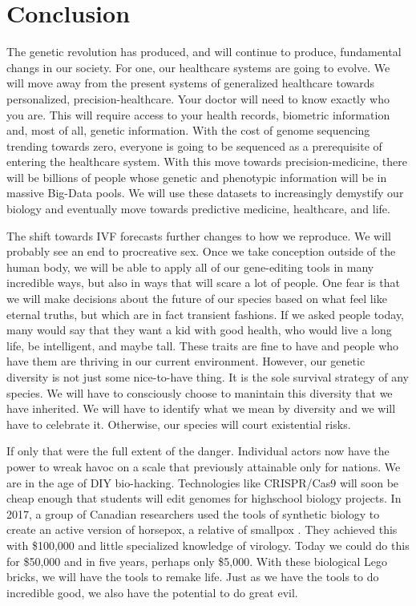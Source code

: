 \section{Conclusion}
\label{sec:conclusion}

The genetic revolution has produced, and will continue to produce, fundamental changs in our society.
For one, our healthcare systems are going to evolve.
We will move away from the present systems of generalized healthcare towards personalized, precision-healthcare.
Your doctor will need to know exactly who you are.
This will require access to your health records, biometric information and, most of all, genetic information.
With the cost of genome sequencing trending towards zero, everyone is going to be sequenced as a prerequisite of entering the healthcare system.
With this move towards precision-medicine, there will be billions of people whose genetic and phenotypic information will be in massive Big-Data pools.
We will use these datasets to increasingly demystify our biology and eventually move towards predictive medicine, healthcare, and life.

The shift towards IVF forecasts further changes to how we reproduce.
We will probably see an end to procreative sex.
Once we take conception outside of the human body, we will be able to apply all of our gene-editing tools in many incredible ways, but also in ways that will scare a lot of people.
One fear is that we will make decisions about the future of our species based on what feel like eternal truths, but which are in fact transient fashions.
If we asked people today, many would say that they want a kid with good health, who would live a long life, be intelligent, and maybe tall.
These traits are fine to have and people who have them are thriving in our current environment.
However, our genetic diversity is not just some nice-to-have thing.
It is the sole survival strategy of any species.
We will have to consciously choose to manintain this diversity that we have inherited.
We will have to identify what we mean by diversity and we will have to celebrate it.
Otherwise, our species will court existential risks.

If only that were the full extent of the danger.
Individual actors now have the power to wreak havoc on a scale that previously attainable only for nations.
We are in the age of DIY bio-hacking.
Technologies like CRISPR/Cas9 will soon be cheap enough that students will edit genomes for highschool biology projects.
In 2017, a group of Canadian researchers used the tools of synthetic biology to create an active version of horsepox, a relative of smallpox \cite{Kupferschmidt2017}.
They achieved this with \$100,000 and little specialized knowledge of virology.
Today we could do this for \$50,000 and in five years, perhaps only \$5,000.
With these biological Lego bricks, we will have the tools to remake life.
Just as we have the tools to do incredible good, we also have the potential to do great evil.

